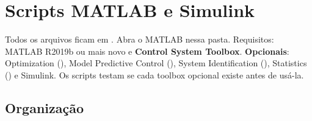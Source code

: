 \chapter{Scripts MATLAB e Simulink}
\label{ap:matlab}

Todos os arquivos ficam em . Abra o MATLAB nessa pasta.
Requisitos: MATLAB R2019b ou mais novo e \textbf{Control System Toolbox}.
\textbf{Opcionais}: Optimization (), Model Predictive Control
(), System Identification (), Statistics ()
e Simulink. Os scripts testam se cada toolbox opcional existe antes de usá-la.

\section{Organização}

